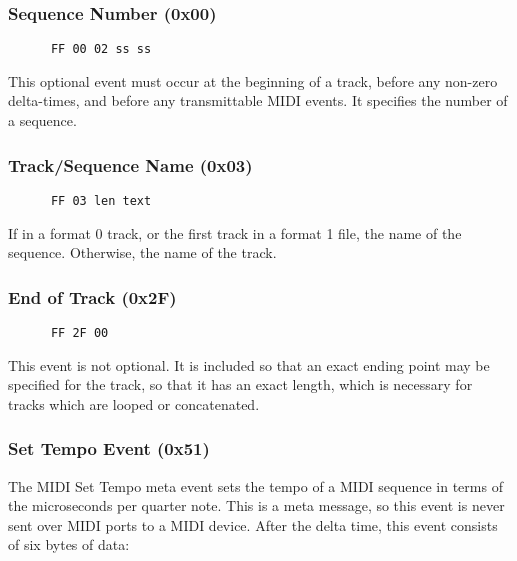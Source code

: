 \subsubsection{Sequence Number (0x00)}
\label{subsubsec:midi_format_meta_sequence_number}

   \begin{verbatim}
      FF 00 02 ss ss
   \end{verbatim}

   This optional event must occur at the beginning of a track,
   before any non-zero delta-times, and before any transmittable MIDI
   events.  It specifies the number of a sequence.

\subsubsection{Track/Sequence Name (0x03)}
\label{subsubsec:midi_format_meta_sequence_name}

   \begin{verbatim}
      FF 03 len text
   \end{verbatim}

   If in a format 0 track, or the first track in a format 1 file, the name
   of the sequence.  Otherwise, the name of the track.

\subsubsection{End of Track (0x2F)}
\label{subsubsec:midi_format_meta_end_of_track}

   \begin{verbatim}
      FF 2F 00
   \end{verbatim}

   This event is not optional.  It is included so that an exact ending
   point may be specified for the track, so that it has an exact length,
   which is necessary for tracks which are looped or concatenated.

\subsubsection{Set Tempo Event (0x51)}
\label{subsubsec:midi_format_meta_set_tempo}

   The MIDI Set Tempo meta event sets the tempo of a MIDI sequence in terms of
   the microseconds per quarter note.  This is a meta message, so this event is
   never sent over MIDI ports to a MIDI device.
   After the delta time, this event consists of six bytes of data:

